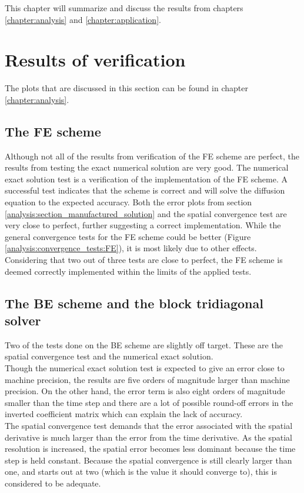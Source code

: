 \noindent This chapter will summarize and discuss the results from chapters \ref{chapter:analysis} and \ref{chapter:application}.

\section{Results of verification}
The plots that are discussed in this section can be found in chapter \ref{chapter:analysis}.

\subsection{The FE scheme}
Although not all of the results from verification of the FE scheme are perfect, the results from testing the exact numerical solution are very good. 
The numerical exact solution test is a verification of the implementation of the FE scheme. 
A successful test indicates that the scheme is correct and will solve the diffusion equation to the expected accuracy. 
Both the error plots from section \ref{analysis:section_manufactured_solution} and the spatial convergence test are very close to perfect, further suggesting a correct implementation. 
While the general convergence tests for the FE scheme could be better (Figure \ref{analysis:convergence_tests:FE}), it is most likely due to other effects. \\
Considering that two out of three tests are close to perfect, the FE scheme is deemed correctly implemented within the limits of the applied tests.

\subsection{The BE scheme and the block tridiagonal solver}
Two of the tests done on the BE scheme are slightly off target. 
These are the spatial convergence test and the numerical exact solution. \\
Though the numerical exact solution test is expected to give an error close to machine precision, the results are five orders of magnitude larger than machine precision. 
On the other hand, the error term is also eight orders of magnitude smaller than the time step and there are a lot of possible round-off errors in the inverted coefficient matrix which can explain the lack of accuracy. \\
The spatial convergence test demands that the error associated with the spatial derivative is much larger than the error from the time derivative. 
As the spatial resolution is increased, the spatial error becomes less dominant because the time step is held constant. 
Because the spatial convergence is still clearly larger than one, and starts out at two (which is the value it should converge to), this is considered to be adequate. \\

